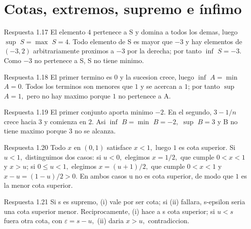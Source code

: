 \documentclass[10pt,a4paper,oneside,openany]{book}
\begin{document}
\section{Cotas, extremos, supremo e ínfimo}
\begin{PSevenAnswerFixed}{Respuesta 1.17}
El elemento \(4\) pertenece a S y domina a todos los demas, luego \(\sup\) \(S=\max\) \(S=4\). Todo elemento de S es mayor que \(-3\) y hay elementos de \((-3,2)\) arbitrariamente proximos a \(-3\) por la derecha; por tanto \(\inf\) \(S=-3\). Como \(-3\) no pertenece a S, S no tiene minimo.
\end{PSevenAnswerFixed}
\begin{PSevenAnswerFixed}{Respuesta 1.18}
El primer termino es \(0\) y la sucesion crece, luego \(\inf\) \(A=\min\) \(A=0\). Todos los terminos son menores que \(1\) y se acercan a \(1\); por tanto \(\sup\) \(A=1,\) pero no hay maximo porque \(1\) no pertenece a A.
\end{PSevenAnswerFixed}
\begin{PSevenAnswerFixed}{Respuesta 1.19}
El primer conjunto aporta minimo \(-2\). En el segundo, \(3-1/n\) crece hacia \(3\) y comienza en \(2\). Asi \(\inf\) \(B=\min\) \(B=-2,\) \(\sup\) \(B=3\) y B no tiene maximo porque \(3\) no se alcanza.
\end{PSevenAnswerFixed}
\begin{PSevenAnswerFixed}{Respuesta 1.20}
Todo \(x\) en \((0,1)\) satisface \(x<1,\) luego \(1\) es cota superior. Si \(u<1,\) distinguimos dos casos: si \(u<0,\) elegimos \(x=1/2,\) que cumple \(0<x<1\) y \(x>u\); si \(0\le u<1,\) elegimos \(x=(u+1)/2,\) que cumple \(0<x<1\) y \(x-u=(1-u)/2>0\). En ambos casos u no es cota superior, de modo que \(1\) es la menor cota superior.
\end{PSevenAnswerFixed}
\begin{PSevenAnswerFixed}{Respuesta 1.21}
Si s es supremo, (i) vale por ser cota; si (ii) fallara, s-epsilon seria una cota superior menor. Reciprocamente, (i) hace a s cota superior; si \(u<s\) fuera otra cota, con \(\varepsilon =s-u,\) (ii) daria \(x>u,\) contradiccion.
\end{PSevenAnswerFixed}
\end{document}
